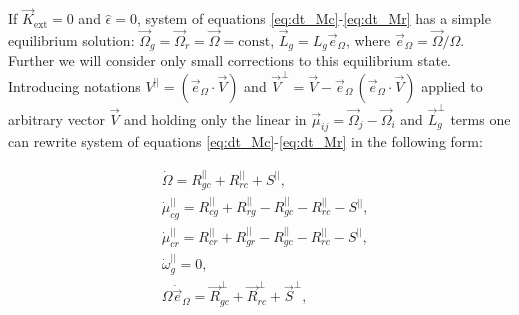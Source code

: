 \documentclass[a4paper]{jpconf}
\newcommand{\eO}{\vec{e}_{\Omega}}
\begin{document}
    If $\vec{K}_\mathrm{ext} = 0$ and $\hat{\epsilon}=0$, system of equations \eqref{eq:dt_Mc}-\eqref{eq:dt_Mr} has a simple equilibrium solution: $\vec{\Omega}_g = \vec{\Omega}_r = \vec{\Omega} = \mbox{const}$, $\vec{L}_g = L_g \vec{e}_{\Omega}$, where $\vec{e}_\Omega = \vec{\Omega}/\Omega$.
    Further we will consider only small corrections to this equilibrium state.  
    Introducing notations $V^{||} = (\eO \cdot \vec{V})$ and $\vec{V}^{\perp} = \vec{V} - \eO\, ( \eO \cdot \vec{V})$ applied to arbitrary vector $\vec{V}$ and
    holding only the linear in  $\vec{\mu}_{ij} = \vec{\Omega}_{j} - \vec{\Omega}_{i}$ and $\vec{L}_{g}^{\perp}$ terms one can rewrite system of equations  \eqref{eq:dt_Mc}-\eqref{eq:dt_Mr} in the following form: \\
    \begin{minipage}{0.43\textwidth}
      \begin{align}
        &\dot{\Omega}  =  R_{gc}^{||} + R_{rc}^{||} + S^{||},
        \label{dOmega_linear_pp_eqn}
        \\
        &\dot{\mu}_{cg}^{||}  = 
          R_{cg}^{||} + R_{rg}^{||}
        - R_{gc}^{||} - R_{rc}^{||} - S^{||},
        \label{dmucg_linear_pp_eqn} 
        \\
        &\dot{\mu}_{cr}^{||}  = 
        R_{cr}^{||} + R_{gr}^{||} - R_{gc}^{||} - R_{rc}^{||} - S^{||},
        \label{dmucr_linear_pp_eqn}
        \\
        &\dot{\omega}_{g}^{||}  =  0,
        \label{dLg_linear_pp_eqn}  
        \\
        &\Omega \dot{\vec{e}}_{\Omega}  =  
        \vec{R}_{gc}^{\perp} + \vec{R}_{rc}^{\perp} + \vec{S}^{\perp},
        \label{dOmega_linear_perp_eqn}        
      \end{align}
    \end{minipage}
\end{document}
